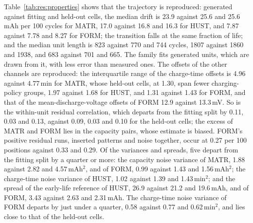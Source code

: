 \documentclass{article}
\begin{document}
Table~\ref{tab:res:properties} shows that the trajectory is reproduced: generated against fitting and held-out cells, the median drift is 23.9 against 25.6 and 25.6\,mAh per 100 cycles for MATR, 17.0 against 16.8 and 16.3 for HUST, and 7.87 against 7.78 and 8.27 for FORM; the transition falls at the same fraction of life; and the median unit length is 823 against 770 and 744 cycles, 1807 against 1860 and 1938, and 683 against 701 and 665. The family fits generated units, which are drawn from it, with less error than measured ones. The offsets of the other channels are reproduced: the interquartile range of the charge-time offsets is 4.96 against 4.77\,min for MATR, whose held-out cells, at 1.30, span fewer charging-policy groups, 1.97 against 1.68 for HUST, and 1.31 against 1.43 for FORM, and that of the mean-discharge-voltage offsets of FORM 12.9 against 13.3\,mV. So is the within-unit residual correlation, which departs from the fitting split by 0.11, 0.03 and 0.13, against 0.09, 0.03 and 0.10 for the held-out cells; the excess of MATR and FORM lies in the capacity pairs, whose estimate is biased. FORM's positive residual runs, inserted patterns and noise together, occur at 0.27 per 100 positions against 0.33 and 0.29. Of the variances and spreads, five depart from the fitting split by a quarter or more: the capacity noise variance of MATR, 1.88 against 2.82 and 4.57\,mAh$^2$, and of FORM, 0.99 against 1.43 and 1.56\,mAh$^2$; the charge-time noise variance of HUST, 1.02 against 1.39 and 1.43\,min$^2$; and the spread of the early-life reference of HUST, 26.9 against 21.2 and 19.6\,mAh, and of FORM, 3.43 against 2.63 and 2.31\,mAh. The charge-time noise variance of FORM departs by just under a quarter, 0.58 against 0.77 and 0.62\,min$^2$, and lies close to that of the held-out cells.
\end{document}
